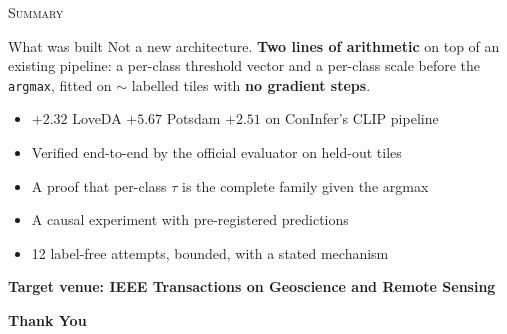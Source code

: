 \documentclass[aspectratio=169]{beamer}
\newcommand{\best}[1]{\textcolor{acc}{\textbf{#1}}}
\newcommand{\ok}[1]{\textcolor{good}{#1}}
\begin{document}
\begin{frame}{\textsc{Summary}}
\begin{block}{What was built}
Not a new architecture. \best{Two lines of arithmetic} on top of an existing
pipeline: a per-class threshold vector and a per-class scale before the
\texttt{argmax}, fitted on $\sim$\calibTiles{} labelled tiles with
\best{no gradient steps}.
\end{block}
\begin{itemize}\small
  \item \ok{$+2.32$ LoveDA \quad $+5.67$ Potsdam \quad $+2.51$ on ConInfer's CLIP pipeline}
  \item \ok{Verified end-to-end by the official evaluator on held-out tiles}
  \item \ok{A proof that per-class $\tau$ is the complete family given the argmax}
  \item \ok{A causal experiment with pre-registered predictions}
  \item \ok{12 label-free attempts, bounded, with a stated mechanism}
\end{itemize}
\vspace{0.5em}
\centering\textbf{Target venue: IEEE Transactions on Geoscience and Remote Sensing}
\end{frame}

\begin{frame}{\textsc{}}
    \centering
    \vspace{2cm}
    \Huge
    \textbf{Thank You}
\end{frame}
\end{document}
